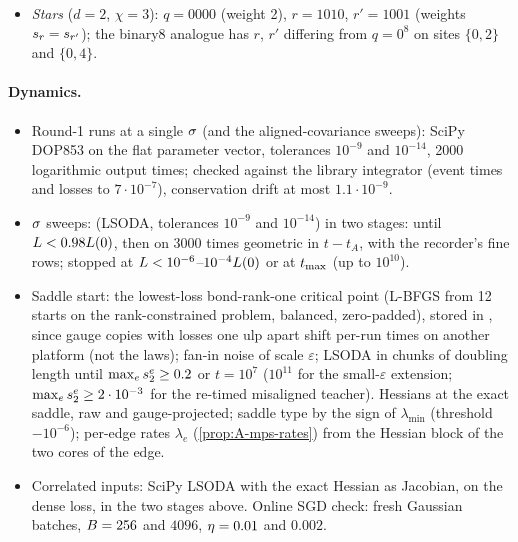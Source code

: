 \begin{itemize}
    ($\Ns=4$) and $0.45$, $0.7$ ($\Ns=8$), weights $(1,0.7)$; misaligned by $20^\circ$ ($\beta=1$ at $\Ns=4$, $\beta=2$ at
    $\Ns=8$) and $45^\circ$ ($\beta=2$, $\Ns=8$); random binary-tree teachers (seeds 302, 303) and random MPS teachers
    (seed 301 at $\Ns=4$, 303 at $\Ns=8$), bond ranks 2, the $n$-th index of each bond weighted by $1$ or $1.5^n$,
    $\normF{\Wt}=1$. Correlated inputs: $d=3$, site-aligned odeco teacher $(1,0.6)$, $c=0$--$0.4$.
  \item \emph{Stars} ($d=2$, $\chi=3$): $q=0000$ (weight 2), $r=1010$, $r'=1001$ (weights $s_{r}=s_{r'}$); the binary8
    analogue has $r$, $r'$ differing from $q=0^8$ on sites $\{0,2\}$ and $\{0,4\}$.
\end{itemize}

\paragraph{Dynamics.}
\begin{itemize}
  \item Round-1 runs at a single $\sigma$ (and the aligned-covariance sweeps): SciPy DOP853 on the flat
    parameter vector, tolerances $10^{-9}$ and $10^{-14}$, 2000 logarithmic output times; checked against the
    library integrator (event times and losses to $7\cdot10^{-7}$), conservation drift at most $1.1\cdot10^{-9}$.
  \item $\sigma$ sweeps:  (LSODA, tolerances $10^{-9}$ and $10^{-14}$) in two stages:
    until $L<0.98L(0)$, then on 3000 times geometric in $t-t_A$, with the recorder's fine rows; stopped
    at $L<10^{-6}$--$10^{-4}L(0)$ or at $t_{\max}$ (up to $10^{10}$).
  \item Saddle start: the lowest-loss bond-rank-one critical point (L-BFGS from 12 starts on the
    rank-constrained problem, balanced, zero-padded), stored in , since
    gauge copies with losses one ulp apart shift per-run times on another platform (not the laws); fan-in
    noise of scale $\varepsilon$; LSODA in chunks of doubling length until $\max_es^{e}_{2}\ge0.2$ or $t=10^7$ ($10^{11}$ for
    the small-$\varepsilon$ extension; $\max_es^{e}_{2}\ge2\cdot10^{-3}$ for the re-timed misaligned teacher). Hessians at
    the exact saddle, raw and gauge-projected; saddle type by the sign of $\lambda_{\min}$ (threshold $-10^{-6}$);
    per-edge rates $\lambda_e$ (\cref{prop:A-mps-rates}) from the Hessian block of the two cores of the edge.
  \item Correlated inputs: SciPy LSODA with the exact Hessian as Jacobian, on the dense loss, in the two
    stages above. Online SGD check: fresh Gaussian batches, $B=256$ and $4096$, $\eta=0.01$ and $0.002$.
\end{itemize}

